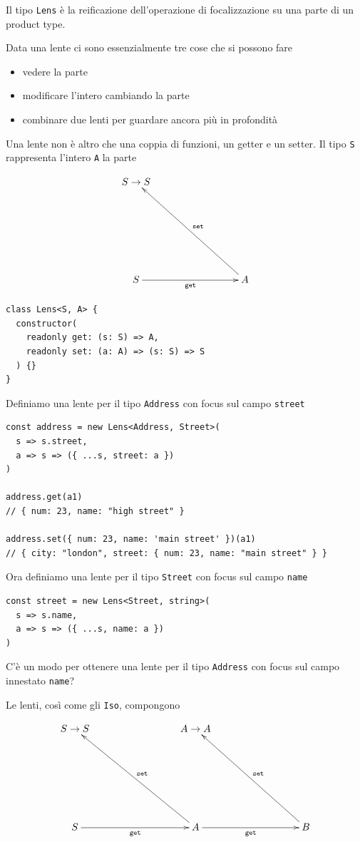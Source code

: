 \documentclass[12pt]{article}
\begin{document}
Il tipo \texttt{Lens} è la reificazione dell'operazione di focalizzazione su una parte di un product type.

Data una lente ci sono essenzialmente tre cose che si possono fare

\begin{itemize}
  \item vedere la parte
  \item modificare l'intero cambiando la parte
  \item combinare due lenti per guardare ancora più in profondità
\end{itemize}

Una lente non è altro che una coppia di funzioni, un getter e un setter. Il tipo \texttt{S} rappresenta l'intero \texttt{A} la parte

\[
\xymatrixrowsep{3cm}
\xymatrixcolsep{3cm}
\xymatrix{
  {S \rightarrow S} \\
  S \ar[r]_{\texttt{get}} & A \ar[lu]_{\texttt{set}}
}
\]

\begin{verbatim}
class Lens<S, A> {
  constructor(
    readonly get: (s: S) => A,
    readonly set: (a: A) => (s: S) => S
  ) {}
}
\end{verbatim}

Definiamo una lente per il tipo \texttt{Address} con focus sul campo \texttt{street}

\begin{verbatim}
const address = new Lens<Address, Street>(
  s => s.street,
  a => s => ({ ...s, street: a })
)

address.get(a1)
// { num: 23, name: "high street" }

address.set({ num: 23, name: 'main street' })(a1)
// { city: "london", street: { num: 23, name: "main street" } }
\end{verbatim}

Ora definiamo una lente per il tipo \texttt{Street} con focus sul campo \texttt{name}

\begin{verbatim}
const street = new Lens<Street, string>(
  s => s.name,
  a => s => ({ ...s, name: a })
)
\end{verbatim}

C'è un modo per ottenere una lente per il tipo \texttt{Address} con focus sul campo innestato \texttt{name}?

Le lenti, così come gli \texttt{Iso}, compongono

\[
\xymatrixrowsep{3cm}
\xymatrixcolsep{3cm}
\xymatrix{
  {S \rightarrow S} & {A \rightarrow A} \\
  S \ar[r]_{\texttt{get}} & A \ar[lu]_{\texttt{set}} \ar[r]_{\texttt{get}} & B \ar[lu]_{\texttt{set}}
}
\]
\end{document}
